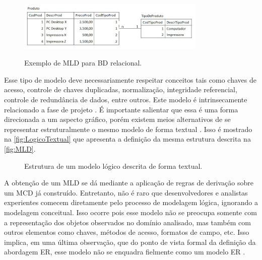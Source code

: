 \begin{figure}[htb]
	\centering
	\caption{Exemplo de MLD para BD relacional.}
		\includegraphics[width=0.8\textwidth]{img/MLD.jpg}
	\label{fig:MLD}
\end{figure}

Esse tipo de modelo deve necessariamente respeitar conceitos tais como chaves de acesso, controle de chaves duplicadas, normalização, integridade referencial, controle de redundância de dados, entre outros. 
Este modelo é intrinsecamente relacionado a fase de projeto \cite{Cougo:2013}. 
É importante salientar que essa é uma forma direcionada a um aspecto gráfico, porém existem meios alternativos de se representar estruturalmente o mesmo modelo de forma textual \cite{Martelli:2018}. 
Isso é mostrado na \autoref{fig:LogicoTextual} que apresenta a definição da mesma estrutura descrita na \autoref{fig:MLD}.

\begin{figure}[!htb]
    \caption{Estrutura de um modelo lógico descrita de forma textual.}
    \label{fig:LogicoTextual}
    \centering
\end{figure}

A obtenção de um \ac{MLD} se dá mediante a aplicação de regras de derivação sobre um \ac{MCD} já construído. 
Entretanto, não é raro que desenvolvedores e analistas experientes comecem diretamente pelo processo de modelagem lógica, ignorando a modelagem conceitual. 
Isso ocorre pois esse modelo não se preocupa somente com a representação dos objetos observados no domínio analisado, mas também com outros elementos como chaves, métodos de acesso, formatos de campo, etc. 
Isso implica, em uma última observação, que do ponto de vista formal da definição da abordagem \ac{ER}, esse modelo não se enquadra fielmente como um modelo \ac{ER} \cite{West:2011}.

